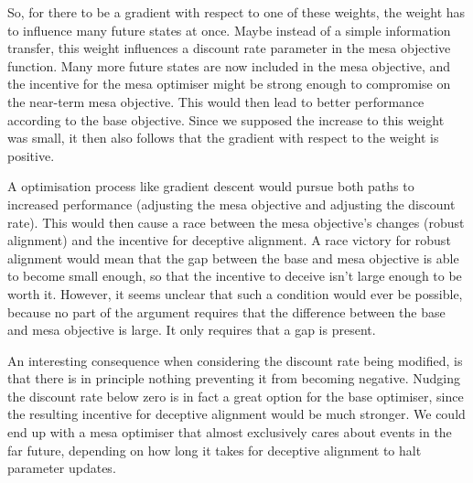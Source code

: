 So, for there to be a gradient with respect to one of these weights, the weight has to influence many future states at
once.
Maybe instead of a simple information transfer, this weight influences a discount rate parameter in the mesa objective
function.
Many more future states are now included in the mesa objective, and the incentive for the mesa optimiser might be strong
enough to compromise on the near-term mesa objective.
This would then lead to better performance according to the base objective.
Since we supposed the increase to this weight was small, it then also follows that the gradient with respect to the
weight is positive.

A optimisation process like gradient descent would pursue both paths to increased performance
(adjusting the mesa objective and adjusting the discount rate).
This would then cause a race between the mesa objective's changes (robust alignment) and the incentive for deceptive
alignment.
A race victory for robust alignment would mean that the gap between the base and mesa objective is able to become
small enough, so that the incentive to deceive isn't large enough to be worth it.
However, it seems unclear that such a condition would ever be possible, because no part of the argument requires
that the difference between the base and mesa objective is large.
It only requires that a gap is present.

An interesting consequence when considering the discount rate being modified, is that there is in principle nothing
preventing it from becoming negative.
Nudging the discount rate below zero is in fact a great option for the base optimiser, since the resulting incentive
for deceptive alignment would be much stronger.
We could end up with a mesa optimiser that almost exclusively cares about events in the far future, depending on how
long it takes for deceptive alignment to halt parameter updates.

